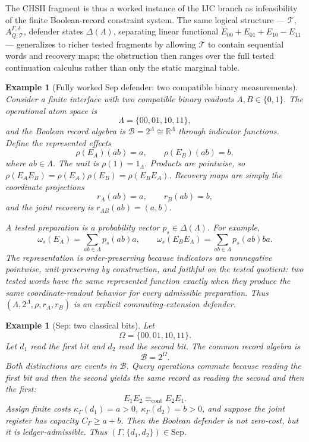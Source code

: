 \documentclass[11pt]{article}
\newtheorem{example}[theorem]{Example}
\newcommand{\Sep}{\mathrm{Sep}}
\newcommand{\R}{\mathbb R}
\begin{document}
The CHSH fragment is thus a worked instance of the IJC branch as
infeasibility of the finite Boolean-record constraint system.  The
same logical structure --- $\mathcal T$, $A^{\Gamma,\delta}_{Q,\mathcal T}$,
defender states $\Delta(\Lambda)$, separating linear functional
$E_{00}+E_{01}+E_{10}-E_{11}$ --- generalizes to richer tested
fragments by allowing $\mathcal T$ to contain sequential words and
recovery maps; the obstruction then ranges over the full tested
continuation calculus rather than only the static marginal table.

\begin{example}[Fully worked Sep defender: two compatible binary measurements]
\label{ex:explicit-sep-defender}
Consider a finite interface with two compatible binary readouts \(A,B\in\{0,1\}\).  The operational atom space is
\[
  \Lambda=\{00,01,10,11\},
\]
and the Boolean record algebra is \(\mathcal B=2^\Lambda\cong\R^\Lambda\) through indicator functions.  Define the represented effects
\[
  \rho(E_A)(ab)=a,
  \qquad
  \rho(E_B)(ab)=b,
\]
where \(ab\in\Lambda\).  The unit is \(\rho(1)=1_\Lambda\).  Products are pointwise, so \(\rho(E_AE_B)=\rho(E_A)\rho(E_B)=\rho(E_BE_A)\).  Recovery maps are simply the coordinate projections
\[
  r_A(ab)=a,
  \qquad r_B(ab)=b,
\]
and the joint recovery is \(r_{AB}(ab)=(a,b)\).

A tested preparation is a probability vector \(p_s\in\Delta(\Lambda)\).  For example,
\[
  \omega_s(E_A)=\sum_{ab\in\Lambda}p_s(ab)a,
  \qquad
  \omega_s(E_BE_A)=\sum_{ab\in\Lambda}p_s(ab)ba .
\]
The representation is order-preserving because indicators are nonnegative pointwise, unit-preserving by construction, and faithful on the tested quotient: two tested words have the same represented function exactly when they produce the same coordinate-readout behavior for every admissible preparation.  Thus \((\Lambda,2^\Lambda,\rho,r_A,r_B)\) is an explicit commuting-extension defender.
\end{example}

\begin{example}[Sep: two classical bits]
Let
\[
 \Omega=\{00,01,10,11\}.
\]
Let $d_1$ read the first bit and $d_2$ read the second bit.  The common record algebra is
\[
 \mathcal B=2^\Omega.
\]
Both distinctions are events in $\mathcal B$.  Query operations commute because reading the first bit and then the second yields the same record as reading the second and then the first:
\[
 E_1E_2\equiv_{\mathrm{cont}}E_2E_1.
\]
Assign finite costs \(\kappa_\Gamma(d_1)=a>0\), \(\kappa_\Gamma(d_2)=b>0\), and suppose the joint register has capacity \(C_\Gamma\ge a+b\).  Then the Boolean defender is not zero-cost, but it is ledger-admissible.  Thus \((\Gamma,\{d_1,d_2\})\in\Sep\).
\end{example}
\end{document}
